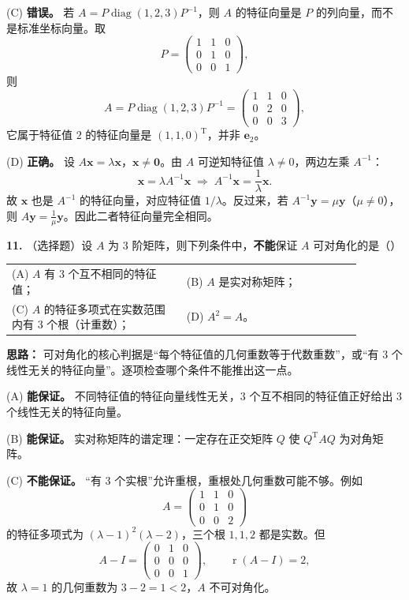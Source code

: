 (C) \textbf{错误。} 若 \(A=P\operatorname{diag}(1,2,3)P^{-1}\)，则 \(A\) 的特征向量是 \(P\) 的列向量，而不是标准坐标向量。取
\[
P=\begin{pmatrix}1&1&0\\0&1&0\\0&0&1\end{pmatrix},
\]
则
\[
A=P\operatorname{diag}(1,2,3)P^{-1}
=\begin{pmatrix}1&1&0\\0&2&0\\0&0&3\end{pmatrix},
\]
它属于特征值 \(2\) 的特征向量是 \((1,1,0)^{\mathrm{T}}\)，并非 \(\mathbf{e}_2\)。

(D) \textbf{正确。} 设 \(A\mathbf{x}=\lambda\mathbf{x}\)，\(\mathbf{x}\neq\mathbf{0}\)。由 \(A\) 可逆知特征值 \(\lambda\neq0\)，两边左乘 \(A^{-1}\)：
\[
\mathbf{x}=\lambda A^{-1}\mathbf{x}
\;\Longrightarrow\;
A^{-1}\mathbf{x}=\frac1\lambda\mathbf{x}.
\]
故 \(\mathbf{x}\) 也是 \(A^{-1}\) 的特征向量，对应特征值 \(1/\lambda\)。反过来，若 \(A^{-1}\mathbf{y}=\mu\mathbf{y}\)（\(\mu\neq0\)），则 \(A\mathbf{y}=\frac1\mu\mathbf{y}\)。因此二者特征向量完全相同。

\else \answerarea[8] \fi%

\textbf{11.} （选择题）设 \(A\) 为 \(3\) 阶矩阵，则下列条件中，\textbf{不能}保证 \(A\) 可对角化的是（\quad）
\begin{center}
\begin{tabular}{p{0.44\linewidth}p{0.44\linewidth}}
(A) \(A\) 有 \(3\) 个互不相同的特征值； &
(B) \(A\) 是实对称矩阵； \\[6pt]
(C) \(A\) 的特征多项式在实数范围内有 \(3\) 个根（计重数）； &
(D) \(A^2=A\)。
\end{tabular}
\end{center}

\ifshowsolutions%
\textbf{思路：} 可对角化的核心判据是“每个特征值的几何重数等于代数重数”，或“有 \(3\) 个线性无关的特征向量”。逐项检查哪个条件不能推出这一点。

(A) \textbf{能保证。} 不同特征值的特征向量线性无关，\(3\) 个互不相同的特征值正好给出 \(3\) 个线性无关的特征向量。

(B) \textbf{能保证。} 实对称矩阵的谱定理：一定存在正交矩阵 \(Q\) 使 \(Q^{\mathrm{T}}AQ\) 为对角矩阵。

(C) \textbf{不能保证。} “有 \(3\) 个实根”允许重根，重根处几何重数可能不够。例如
\[
A=\begin{pmatrix}1&1&0\\0&1&0\\0&0&2\end{pmatrix}
\]
的特征多项式为 \((\lambda-1)^2(\lambda-2)\)，三个根 \(1,1,2\) 都是实数。但
\[
A-I=\begin{pmatrix}0&1&0\\0&0&0\\0&0&1\end{pmatrix},\qquad \operatorname{r}(A-I)=2,
\]
故 \(\lambda=1\) 的几何重数为 \(3-2=1<2\)，\(A\) 不可对角化。

